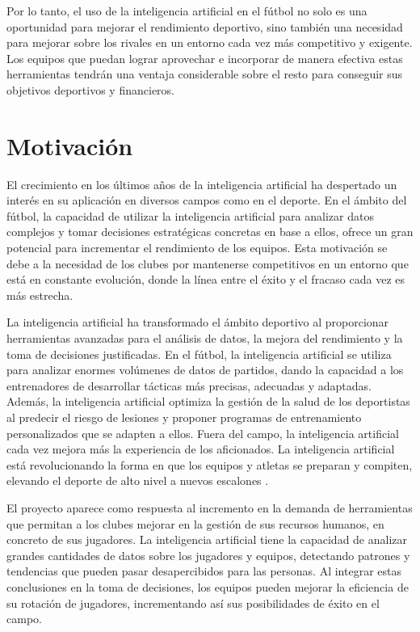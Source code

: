 Por lo tanto, el uso de la inteligencia artificial en el fútbol no solo es una oportunidad para mejorar el rendimiento deportivo, sino también una necesidad para mejorar sobre los rivales en un entorno cada vez más competitivo y exigente. Los equipos que puedan lograr aprovechar e incorporar de manera efectiva estas herramientas tendrán una ventaja considerable sobre el resto para conseguir sus objetivos deportivos y financieros.

















\section{Motivación}

El crecimiento en los últimos años de la inteligencia artificial ha despertado un interés en su aplicación en diversos campos como en el deporte. En el ámbito del fútbol, la capacidad de utilizar la inteligencia artificial para analizar datos complejos y tomar decisiones estratégicas concretas en base a ellos, ofrece un gran potencial para incrementar el rendimiento de los equipos. Esta motivación se debe a la necesidad de los clubes por mantenerse competitivos en un entorno que está en constante evolución, donde la línea entre el éxito y el fracaso cada vez es más estrecha.

La inteligencia artificial ha transformado el ámbito deportivo al proporcionar herramientas avanzadas para el análisis de datos, la mejora del rendimiento y la toma de decisiones justificadas. En el fútbol, la inteligencia artificial se utiliza para analizar enormes volúmenes de datos de partidos, dando la capacidad a los entrenadores de desarrollar tácticas más precisas, adecuadas y adaptadas. Además, la inteligencia artificial optimiza la gestión de la salud de los deportistas al predecir el riesgo de lesiones y proponer programas de entrenamiento personalizados que se adapten a ellos. Fuera del campo, la inteligencia artificial cada vez mejora más la experiencia de los aficionados. La inteligencia artificial está revolucionando la forma en que los equipos y atletas se preparan y compiten, elevando el deporte de alto nivel a nuevos escalones \cite{ia-deporte}.

El proyecto aparece como respuesta al incremento en la demanda de herramientas que permitan a los clubes mejorar en la gestión de sus recursos humanos, en concreto de sus jugadores. La inteligencia artificial tiene la capacidad de analizar grandes cantidades de datos sobre los jugadores y equipos, detectando patrones y tendencias que pueden pasar desapercibidos para las personas. Al integrar estas conclusiones en la toma de decisiones, los equipos pueden mejorar la eficiencia de su rotación de jugadores, incrementando así sus posibilidades de éxito en el campo.

